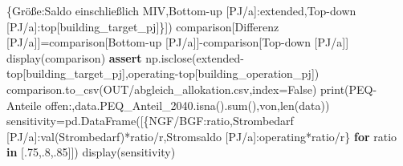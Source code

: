 \documentclass[
  ngerman,
  a4paper,
  DIV=11]{scrreprt}
\newenvironment{Shaded}{\begin{snugshade}}{\end{snugshade}}
\newcommand{\BuiltInTok}[1]{\textcolor[rgb]{0.00,0.23,0.31}{#1}}
\newcommand{\ControlFlowTok}[1]{\textcolor[rgb]{0.00,0.23,0.31}{\textbf{#1}}}
\newcommand{\FloatTok}[1]{\textcolor[rgb]{0.68,0.00,0.00}{#1}}
\newcommand{\KeywordTok}[1]{\textcolor[rgb]{0.00,0.23,0.31}{\textbf{#1}}}
\newcommand{\NormalTok}[1]{\textcolor[rgb]{0.00,0.23,0.31}{#1}}
\newcommand{\OperatorTok}[1]{\textcolor[rgb]{0.37,0.37,0.37}{#1}}
\newcommand{\StringTok}[1]{\textcolor[rgb]{0.13,0.47,0.30}{#1}}
\newcommand{\VariableTok}[1]{\textcolor[rgb]{0.07,0.07,0.07}{#1}}
\begin{document}
\begin{Shaded}
\begin{Highlighting}[]
\NormalTok{ \{}\StringTok{\textquotesingle{}Größe\textquotesingle{}}\NormalTok{:}\StringTok{\textquotesingle{}Saldo einschließlich MIV\textquotesingle{}}\NormalTok{,}\StringTok{\textquotesingle{}Bottom{-}up [PJ/a]\textquotesingle{}}\NormalTok{:extended,}\StringTok{\textquotesingle{}Top{-}down [PJ/a]\textquotesingle{}}\NormalTok{:top[}\StringTok{\textquotesingle{}building\_target\_pj\textquotesingle{}}\NormalTok{]\}])}
\NormalTok{comparison[}\StringTok{\textquotesingle{}Differenz [PJ/a]\textquotesingle{}}\NormalTok{]}\OperatorTok{=}\NormalTok{comparison[}\StringTok{\textquotesingle{}Bottom{-}up [PJ/a]\textquotesingle{}}\NormalTok{]}\OperatorTok{{-}}\NormalTok{comparison[}\StringTok{\textquotesingle{}Top{-}down [PJ/a]\textquotesingle{}}\NormalTok{]}
\NormalTok{display(comparison)}
\ControlFlowTok{assert}\NormalTok{ np.isclose(extended}\OperatorTok{{-}}\NormalTok{top[}\StringTok{\textquotesingle{}building\_target\_pj\textquotesingle{}}\NormalTok{],operating}\OperatorTok{{-}}\NormalTok{top[}\StringTok{\textquotesingle{}building\_operation\_pj\textquotesingle{}}\NormalTok{])}
\NormalTok{comparison.to\_csv(OUT}\OperatorTok{/}\StringTok{\textquotesingle{}abgleich\_allokation.csv\textquotesingle{}}\NormalTok{,index}\OperatorTok{=}\VariableTok{False}\NormalTok{)}
\BuiltInTok{print}\NormalTok{(}\StringTok{\textquotesingle{}PEQ{-}Anteile offen:\textquotesingle{}}\NormalTok{,data.PEQ\_Anteil\_2040.isna().}\BuiltInTok{sum}\NormalTok{(),}\StringTok{\textquotesingle{}von\textquotesingle{}}\NormalTok{,}\BuiltInTok{len}\NormalTok{(data))}
\NormalTok{sensitivity}\OperatorTok{=}\NormalTok{pd.DataFrame([\{}\StringTok{\textquotesingle{}NGF/BGF\textquotesingle{}}\NormalTok{:ratio,}\StringTok{\textquotesingle{}Strombedarf [PJ/a]\textquotesingle{}}\NormalTok{:val(}\StringTok{\textquotesingle{}Strombedarf\textquotesingle{}}\NormalTok{)}\OperatorTok{*}\NormalTok{ratio}\OperatorTok{/}\NormalTok{r,}\StringTok{\textquotesingle{}Stromsaldo [PJ/a]\textquotesingle{}}\NormalTok{:operating}\OperatorTok{*}\NormalTok{ratio}\OperatorTok{/}\NormalTok{r\} }\ControlFlowTok{for}\NormalTok{ ratio }\KeywordTok{in}\NormalTok{ [}\FloatTok{.75}\NormalTok{,}\FloatTok{.8}\NormalTok{,}\FloatTok{.85}\NormalTok{]])}
\NormalTok{display(sensitivity)}


\end{Highlighting}
\end{Shaded}
\end{document}
